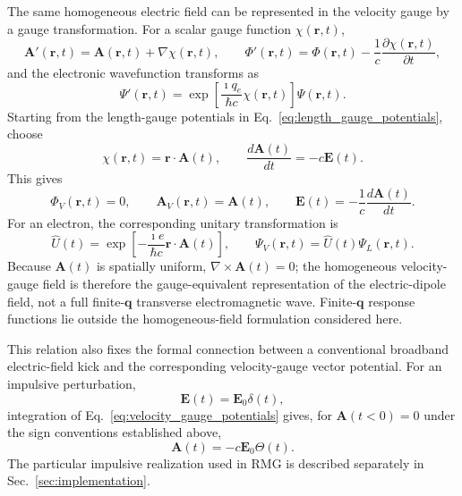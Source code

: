 The same homogeneous electric field can be represented in the velocity
gauge by a gauge transformation.  For a scalar gauge function
$\chi(\mathbf r,t)$,
\begin{equation}
  \mathbf A'(\mathbf r,t)
  =
  \mathbf A(\mathbf r,t)+\nabla\chi(\mathbf r,t),
  \qquad
  \Phi'(\mathbf r,t)
  =
  \Phi(\mathbf r,t)
  -
  \frac{1}{c}
  \frac{\partial\chi(\mathbf r,t)}{\partial t},
  \label{eq:gauge_transformation_potentials}
\end{equation}
and the electronic wavefunction transforms as
\begin{equation}
  \Psi'(\mathbf r,t)
  =
  \exp\!\left[
    \frac{\imath q_e}{\hbar c}\chi(\mathbf r,t)
  \right]
  \Psi(\mathbf r,t).
  \label{eq:gauge_transformation_wavefunction}
\end{equation}
Starting from the length-gauge potentials in
Eq.~\eqref{eq:length_gauge_potentials}, choose
\begin{equation}
  \chi(\mathbf r,t)=\mathbf r\cdot\mathbf A(t),
  \qquad
  \frac{d\mathbf A(t)}{dt}=-c\mathbf E(t).
  \label{eq:goppert_mayer_chi}
\end{equation}
This gives
\begin{equation}
  \Phi_V(\mathbf r,t)=0,
  \qquad
  \mathbf A_V(\mathbf r,t)=\mathbf A(t),
  \qquad
  \mathbf E(t)=-\frac{1}{c}\frac{d\mathbf A(t)}{dt}.
  \label{eq:velocity_gauge_potentials}
\end{equation}
For an electron, the corresponding unitary transformation is
\begin{equation}
  \hat U(t)
  =
  \exp\!\left[
    -\frac{\imath e}{\hbar c}
    \mathbf r\cdot\mathbf A(t)
  \right],
  \qquad
  \Psi_V(\mathbf r,t)=\hat U(t)\Psi_L(\mathbf r,t).
  \label{eq:goppert_mayer_unitary}
\end{equation}
Because $\mathbf A(t)$ is spatially uniform,
$\nabla\times\mathbf A(t)=0$; the homogeneous velocity-gauge field is
therefore the gauge-equivalent representation of the electric-dipole
field, not a full finite-$\mathbf q$ transverse electromagnetic wave.
Finite-$\mathbf q$ response functions lie outside the homogeneous-field
formulation considered here.

This relation also fixes the formal connection between a conventional
broadband electric-field kick and the corresponding velocity-gauge vector
potential.  For an impulsive perturbation,
\begin{equation}
  \mathbf E(t)=\mathbf E_0\delta(t),
  \label{eq:delta_electric_kick}
\end{equation}
integration of Eq.~\eqref{eq:velocity_gauge_potentials} gives, for
$\mathbf A(t<0)=0$ under the sign conventions established above,
\begin{equation}
  \mathbf A(t)=-c\mathbf E_0\Theta(t).
  \label{eq:step_vector_potential}
\end{equation}
The particular impulsive realization used in RMG is described separately
in Sec.~\ref{sec:implementation}.

